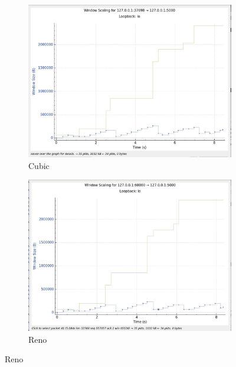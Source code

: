 \documentclass{report}
\begin{document}
\begin{figure}[H]
    \centering
    \begin{subfigure}[b]{0.45\textwidth}
        \centering
        \includegraphics[width=\textwidth]{Pics/Cubic/r1mbit_s1m_ws}
        \caption{Cubic}
    \end{subfigure}
    \hfill
    \begin{subfigure}[b]{0.45\textwidth}
        \centering
        \includegraphics[width=\textwidth]{Pics/Reno/r1mbit_s1m_ws}
        \caption{Reno}
    \end{subfigure}
    \medskip


\end{figure}
\end{document}
